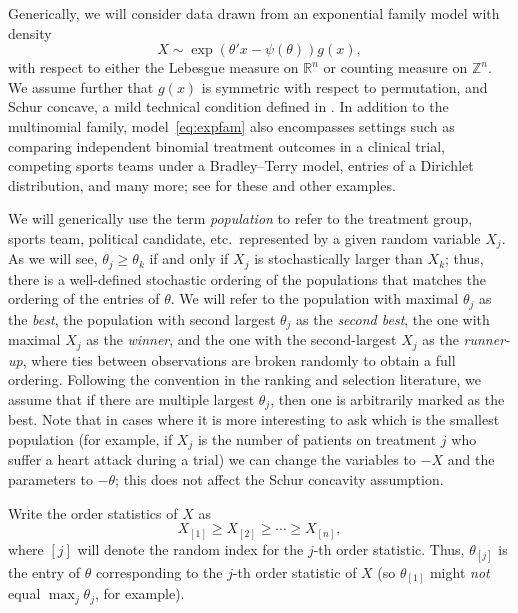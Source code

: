 \documentclass[aos, authoryear]{imsart}
\theoremstyle{definition}
\theoremstyle{custom}
\newcommand{\RR}{\mathbb{R}}
\newcommand{\ZZ}{\mathbb{Z}}
\begin{document}
Generically, we will consider data drawn from an exponential family model with density
\begin{equation}
\label{eq:expfam}
X \sim \exp\left(\theta'x - \psi\left(\theta\right)\right) g\left(x\right),
\end{equation}
with respect to either the Lebesgue measure on $\RR^n$ or counting measure on $\ZZ^n$. We assume further that $g\left(x\right)$ is symmetric with respect to permutation, and Schur concave, a mild technical condition defined in . In addition to the multinomial family, model~\eqref{eq:expfam} also encompasses settings such as comparing independent binomial treatment outcomes in a clinical trial, competing sports teams under a Bradley--Terry model, entries of a Dirichlet distribution, and many more; see  for these and other examples.

We will generically use the term {\em population} to refer to the treatment group, sports team, political candidate, etc.\ represented by a given random variable $X_j$. As we will see, $\theta_j \ge \theta_k$ if and only if $X_j$ is stochastically larger than $X_k$; thus, there is a well-defined stochastic ordering of the populations that matches the ordering of the entries of $\theta$. We will refer to the population with maximal $\theta_j$ as the {\em best}, the population with second largest $\theta_j$ as the {\em second best}, the one with maximal $X_j$ as the {\em winner}, and the one with the second-largest $X_j$ as the {\em runner-up}, where ties between observations are broken randomly to obtain a full ordering. Following the convention in the ranking and selection literature, we assume that if there are multiple largest $\theta_j$, then one is arbitrarily marked as the best. Note that in cases where it is more interesting to ask which is the smallest population (for example, if $X_j$ is the number of patients on treatment $j$ who suffer a heart attack during a trial) we can change the variables to $-X$ and the parameters to $-\theta$; this does not affect the Schur concavity assumption. 

Write the order statistics of $X$ as
$$X_{[1]} \ge X_{[2]} \ge \cdots \ge X_{[n]},$$
where $[j]$ will denote the random index for the $j$-th order statistic. Thus, $\theta_{[j]}$ is the entry of $\theta$ corresponding to the $j$-th order statistic of $X$ (so $\theta_{[1]}$ might {\em not} equal $\max_j \theta_j$, for example).
\end{document}
